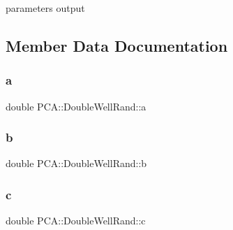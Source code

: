 parameters output 



\subsection{Member Data Documentation}
\hypertarget{class_p_c_a_1_1_double_well_rand_a2291611a2ea4d9c3ee50a904c2fea9b7}{}\label{class_p_c_a_1_1_double_well_rand_a2291611a2ea4d9c3ee50a904c2fea9b7} 
\subsubsection{\texorpdfstring{a}{a}}
{\footnotesize\ttfamily double P\+C\+A\+::\+Double\+Well\+Rand\+::a\hspace{0.3cm}{\ttfamily [private]}}

\hypertarget{class_p_c_a_1_1_double_well_rand_a289b59fbd571f8f377888f48a8c6b8ae}{}\label{class_p_c_a_1_1_double_well_rand_a289b59fbd571f8f377888f48a8c6b8ae} 
\subsubsection{\texorpdfstring{b}{b}}
{\footnotesize\ttfamily double P\+C\+A\+::\+Double\+Well\+Rand\+::b\hspace{0.3cm}{\ttfamily [private]}}

\hypertarget{class_p_c_a_1_1_double_well_rand_a855b2106b6b692f9e837ef282b658c85}{}\label{class_p_c_a_1_1_double_well_rand_a855b2106b6b692f9e837ef282b658c85} 
\subsubsection{\texorpdfstring{c}{c}}
{\footnotesize\ttfamily double P\+C\+A\+::\+Double\+Well\+Rand\+::c\hspace{0.3cm}{\ttfamily [private]}}

\hypertarget{class_p_c_a_1_1_double_well_rand_ab5eed0e97bd8309d5fa44fa2c7d8cbfd}{}\label{class_p_c_a_1_1_double_well_rand_ab5eed0e97bd8309d5fa44fa2c7d8cbfd} 
